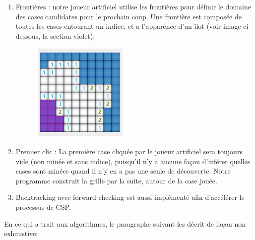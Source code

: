 \documentclass{article}
\begin{document}
\begin{enumerate}
        \item Frontières : notre joueur artificiel utilise les frontières pour définir 
              le domaine des cases candidates pour le prochain coup. Une frontière est 
              composée de toutes les cases entourant un indice, et a l’apparence d’un îlot 
              (voir image ci-dessous, la section violet):
                \begin{figure}[h!]
                \centering
                \includegraphics[scale=.5]{./demineur_2.png}
                \end{figure}
        \item Premier clic : La première case cliquée par le joueur artificiel sera 
              toujours vide (non minée et sans indice), puisqu’il n’y a aucune façon 
              d’inférer quelles cases sont minées quand il n’y en a pas une seule de 
              découverte. Notre programme construit la grille par la suite, autour de la case jouée.
        \item Backtracking avec forward checking est aussi implémenté afin d’accélérer le processus de CSP.
\end{enumerate}

En ce qui a trait aux algorithmes, le paragraphe suivant les décrit de façon non exhaustive:
\end{document}
